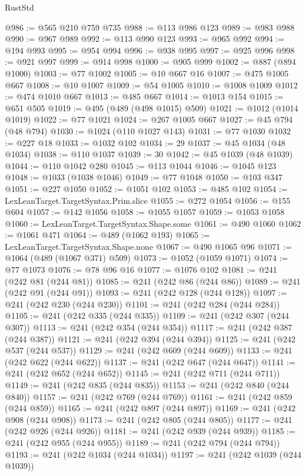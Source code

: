\begin{lexlean}{RustStd}
\begin{coremodule}
@986 := @565 @210 @759 @735
@988 := @113 @986 @123
@989 := @983 @988
@990 := @967 @989
@992 := @113 @990 @123
@993 := @965 @992
@994 := @194 @993
@995 := @954 @994
@996 := @938 @995
@997 := @925 @996
@998 := @921 @997
@999 := @914 @998
@1000 := @905 @999
@1002 := @887 (@894 @1000)
@1003 := @77 @1002
@1005 := @10 @667 @16
@1007 := @475 @1005 @667
@1008 := @10 @1007
@1009 := @54 @1005
@1010 := @1008 @1009
@1012 := @474 @1010 @667
@1013 := @485 @667
@1014 := @1013 @154
@1015 := @651 @505
@1019 := @495 (@489 (@498 @1015) @509)
@1021 := @1012 (@1014 @1019)
@1022 := @77 @1021
@1024 := @267 @1005 @667
@1027 := @45 @794 (@48 @794)
@1030 := @1024 (@110 @1027 @143)
@1031 := @77 @1030
@1032 := @227 @18
@1033 := @1032 @102
@1034 := 29
@1037 := @45 @1034 (@48 @1034)
@1038 := @110 @1037
@1039 := 30
@1042 := @45 @1039 (@48 @1039)
@1044 := @110 @1042 @280
@1045 := @113 @1044
@1046 := @1045 @123
@1048 := @1033 (@1038 @1046)
@1049 := @77 @1048
@1050 := @103 @347
@1051 := @227 @1050
@1052 := @1051 @102
@1053 := @485 @102
@1054 := LexLeanTarget.TargetSyntax.Prim.slice
@1055 := @272 @1054
@1056 := @155 @604
@1057 := @142 @1056
@1058 := @1055 @1057
@1059 := @1053 @1058
@1060 := LexLeanTarget.TargetSyntax.Shape.some
@1061 := @490 @1060
@1062 := @1061 @471
@1064 := @489 (@1062 @193)
@1065 := LexLeanTarget.TargetSyntax.Shape.none
@1067 := @490 @1065 @96
@1071 := @1064 (@489 (@1067 @371) @509)
@1073 := @1052 (@1059 @1071)
@1074 := @77 @1073
@1076 := @78 @96 @16
@1077 := @1076 @102
@1081 := @241 (@242 @81 (@244 @81))
@1085 := @241 (@242 @86 (@244 @86))
@1089 := @241 (@242 @91 (@244 @91))
@1093 := @241 (@242 @128 (@244 @128))
@1097 := @241 (@242 @230 (@244 @230))
@1101 := @241 (@242 @284 (@244 @284))
@1105 := @241 (@242 @335 (@244 @335))
@1109 := @241 (@242 @307 (@244 @307))
@1113 := @241 (@242 @354 (@244 @354))
@1117 := @241 (@242 @387 (@244 @387))
@1121 := @241 (@242 @394 (@244 @394))
@1125 := @241 (@242 @537 (@244 @537))
@1129 := @241 (@242 @609 (@244 @609))
@1133 := @241 (@242 @622 (@244 @622))
@1137 := @241 (@242 @647 (@244 @647))
@1141 := @241 (@242 @652 (@244 @652))
@1145 := @241 (@242 @711 (@244 @711))
@1149 := @241 (@242 @835 (@244 @835))
@1153 := @241 (@242 @840 (@244 @840))
@1157 := @241 (@242 @769 (@244 @769))
@1161 := @241 (@242 @859 (@244 @859))
@1165 := @241 (@242 @897 (@244 @897))
@1169 := @241 (@242 @908 (@244 @908))
@1173 := @241 (@242 @805 (@244 @805))
@1177 := @241 (@242 @926 (@244 @926))
@1181 := @241 (@242 @939 (@244 @939))
@1185 := @241 (@242 @955 (@244 @955))
@1189 := @241 (@242 @794 (@244 @794))
@1193 := @241 (@242 @1034 (@244 @1034))
@1197 := @241 (@242 @1039 (@244 @1039))

\end{coremodule}
\end{lexlean}
